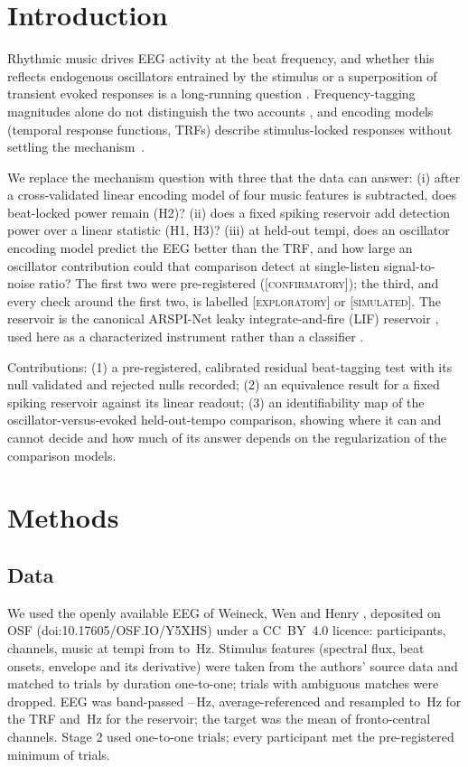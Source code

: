 \documentclass[journal]{IEEEtran}
\newcommand{\Conf}{\textsc{[confirmatory]}\xspace}
\newcommand{\Expl}{\textsc{[exploratory]}\xspace}
\newcommand{\Simul}{\textsc{[simulated]}\xspace}
\begin{document}
\section{Introduction}
Rhythmic music drives EEG activity at the beat frequency, and whether this reflects endogenous oscillators entrained by the stimulus or a superposition of transient evoked responses is a long-running question \cite{doelling2021neural,breska2017delta,vanbree2021sustained}. Frequency-tagging magnitudes alone do not distinguish the two accounts \cite{nozaradan2011tagging,henry2017what,zhou2016interpretations,novembre2018tagging,rajendran2019frequency,doelling2019oscillator,damsma2025tempo}, and encoding models (temporal response functions, TRFs) describe stimulus-locked responses without settling the mechanism~\cite{crosse2016mtrf}.

We replace the mechanism question with three that the data can answer: (i) after a cross-validated linear encoding model of four music features is subtracted, does beat-locked power remain (H2)? (ii) does a fixed spiking reservoir add detection power over a linear statistic (H1, H3)? (iii) at held-out tempi, does an oscillator encoding model predict the EEG better than the TRF, and how large an oscillator contribution could that comparison detect at single-listen signal-to-noise ratio? The first two were pre-registered (\Conf); the third, and every check around the first two, is labelled \Expl or \Simul. The reservoir is the canonical ARSPI-Net leaky integrate-and-fire (LIF) reservoir \cite{lane2024towards}, used here as a characterized instrument rather than a classifier \cite{verstraeten2007experimental,soures2019spiking}.

Contributions: (1) a pre-registered, calibrated residual beat-tagging test with its null validated and rejected nulls recorded; (2) an equivalence result for a fixed spiking reservoir against its linear readout; (3) an identifiability map of the oscillator-versus-evoked held-out-tempo comparison, showing where it can and cannot decide and how much of its answer depends on the regularization of the comparison models.

\section{Methods}
\subsection{Data}
We used the openly available EEG of Weineck, Wen and Henry \cite{weineck2022neural}, deposited on OSF (doi:10.17605/OSF.IO/Y5XHS) under a CC~BY~4.0 licence: \NumNTwo participants, \NumNEeg channels, music at \NumNTempi tempi from \NumTempoMin to \NumTempoMax\,Hz. Stimulus features (spectral flux, beat onsets, envelope and its derivative) were taken from the authors' source data and matched to trials by duration one-to-one; trials with ambiguous matches were dropped. EEG was band-passed \NumBandLo--\NumBandHi\,Hz, average-referenced and resampled to \NumFsTrf\,Hz for the TRF and \NumFsRes\,Hz for the reservoir; the target was the mean of \NumNFc fronto-central channels. Stage 2 used \NumNTrials one-to-one trials; every participant met the pre-registered minimum of \NumMinTrials trials.
\end{document}
